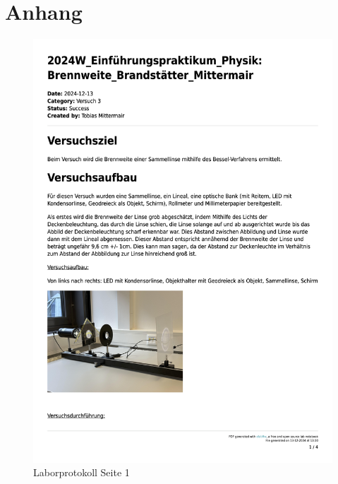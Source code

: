 \documentclass[a4paper,12pt]{article}
\begin{document}
\newpage

\section{Anhang}
\label{sec:Anhang}

\begin{figure}[H]
    \centering
    \includegraphics[width=1\textwidth]{bilder/Protokoll_Bilder/Protokoll1.png}
    \caption{Laborprotokoll Seite 1}
    \label{fig:Protokoll1}
\end{figure}

\newpage
\end{document}
